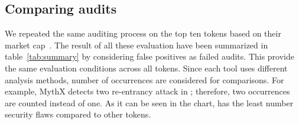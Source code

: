 
\subsection{Comparing audits}
We repeated the same auditing process on the top ten tokens based on their market cap~\cite{EtherScan}. The result of all these evaluation have been summarized in table~\ref{tab:summary} by considering false positives as failed audits. This provide the same evaluation conditions across all tokens. Since each tool uses different analysis methods, number of occurrences are considered for comparisons. For example, MythX detects two re-entrancy attack in \sys; therefore, two occurrences are counted instead of one. As it can be seen in the chart, \sys has the least number security flaws compared to other tokens.


